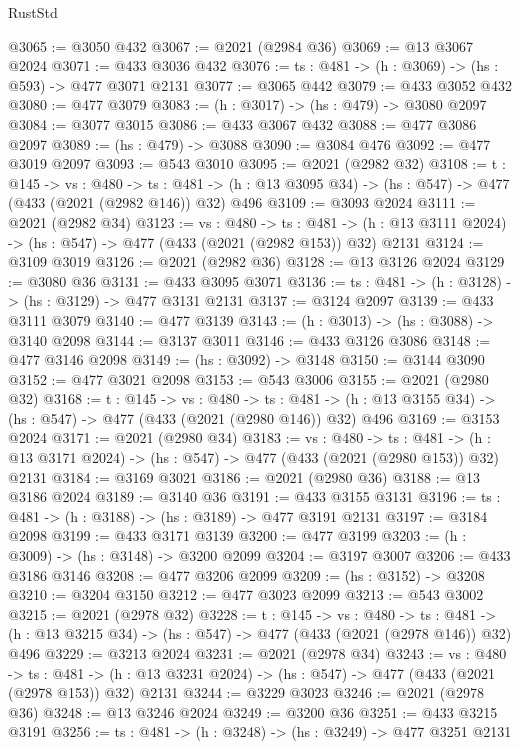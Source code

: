 \begin{lexlean}{RustStd}
\begin{coremodule}
@3065 := @3050 @432
@3067 := @2021 (@2984 @36)
@3069 := @13 @3067 @2024
@3071 := @433 @3036 @432
@3076 := {ts : @481} -> (h : @3069) -> (hs : @593) -> @477 @3071 @2131
@3077 := @3065 @442
@3079 := @433 @3052 @432
@3080 := @477 @3079
@3083 := (h : @3017) -> (hs : @479) -> @3080 @2097
@3084 := @3077 @3015
@3086 := @433 @3067 @432
@3088 := @477 @3086 @2097
@3089 := (hs : @479) -> @3088
@3090 := @3084 @476
@3092 := @477 @3019 @2097
@3093 := @543 @3010
@3095 := @2021 (@2982 @32)
@3108 := {t : @145} ->
  {vs : @480} ->
  {ts : @481} -> (h : @13 @3095 @34) -> (hs : @547) -> @477 (@433 (@2021 (@2982 @146)) @32) @496
@3109 := @3093 @2024
@3111 := @2021 (@2982 @34)
@3123 := {vs : @480} ->
  {ts : @481} -> (h : @13 @3111 @2024) -> (hs : @547) -> @477 (@433 (@2021 (@2982 @153)) @32) @2131
@3124 := @3109 @3019
@3126 := @2021 (@2982 @36)
@3128 := @13 @3126 @2024
@3129 := @3080 @36
@3131 := @433 @3095 @3071
@3136 := {ts : @481} -> (h : @3128) -> (hs : @3129) -> @477 @3131 @2131
@3137 := @3124 @2097
@3139 := @433 @3111 @3079
@3140 := @477 @3139
@3143 := (h : @3013) -> (hs : @3088) -> @3140 @2098
@3144 := @3137 @3011
@3146 := @433 @3126 @3086
@3148 := @477 @3146 @2098
@3149 := (hs : @3092) -> @3148
@3150 := @3144 @3090
@3152 := @477 @3021 @2098
@3153 := @543 @3006
@3155 := @2021 (@2980 @32)
@3168 := {t : @145} ->
  {vs : @480} ->
  {ts : @481} -> (h : @13 @3155 @34) -> (hs : @547) -> @477 (@433 (@2021 (@2980 @146)) @32) @496
@3169 := @3153 @2024
@3171 := @2021 (@2980 @34)
@3183 := {vs : @480} ->
  {ts : @481} -> (h : @13 @3171 @2024) -> (hs : @547) -> @477 (@433 (@2021 (@2980 @153)) @32) @2131
@3184 := @3169 @3021
@3186 := @2021 (@2980 @36)
@3188 := @13 @3186 @2024
@3189 := @3140 @36
@3191 := @433 @3155 @3131
@3196 := {ts : @481} -> (h : @3188) -> (hs : @3189) -> @477 @3191 @2131
@3197 := @3184 @2098
@3199 := @433 @3171 @3139
@3200 := @477 @3199
@3203 := (h : @3009) -> (hs : @3148) -> @3200 @2099
@3204 := @3197 @3007
@3206 := @433 @3186 @3146
@3208 := @477 @3206 @2099
@3209 := (hs : @3152) -> @3208
@3210 := @3204 @3150
@3212 := @477 @3023 @2099
@3213 := @543 @3002
@3215 := @2021 (@2978 @32)
@3228 := {t : @145} ->
  {vs : @480} ->
  {ts : @481} -> (h : @13 @3215 @34) -> (hs : @547) -> @477 (@433 (@2021 (@2978 @146)) @32) @496
@3229 := @3213 @2024
@3231 := @2021 (@2978 @34)
@3243 := {vs : @480} ->
  {ts : @481} -> (h : @13 @3231 @2024) -> (hs : @547) -> @477 (@433 (@2021 (@2978 @153)) @32) @2131
@3244 := @3229 @3023
@3246 := @2021 (@2978 @36)
@3248 := @13 @3246 @2024
@3249 := @3200 @36
@3251 := @433 @3215 @3191
@3256 := {ts : @481} -> (h : @3248) -> (hs : @3249) -> @477 @3251 @2131

\end{coremodule}
\end{lexlean}
